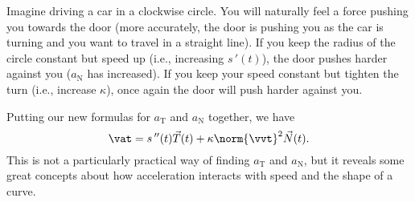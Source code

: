 Imagine driving a car in a clockwise circle. You will naturally feel a force pushing you towards the door (more accurately, the door is pushing you as the car is turning and you want to travel in a straight line). If you keep the radius of the circle constant but speed up (i.e., increasing $s\,'(t)$), the door pushes harder against you ($a_\text{N}$ has increased). If you keep your speed constant but tighten the turn (i.e., increase $\kappa$), once again the door will push harder against you.

Putting our new formulas for $a_\text{T}$ and $a_\text{N}$ together, we have 
\[\vat = s\,''(t)\vec T(t) + \kappa\norm{\vvt}^2\vec N(t).\]
This is not a particularly practical way of finding $a_\text{T}$ and $a_\text{N}$, but it reveals some great concepts about how acceleration interacts with speed and the shape of a curve.


